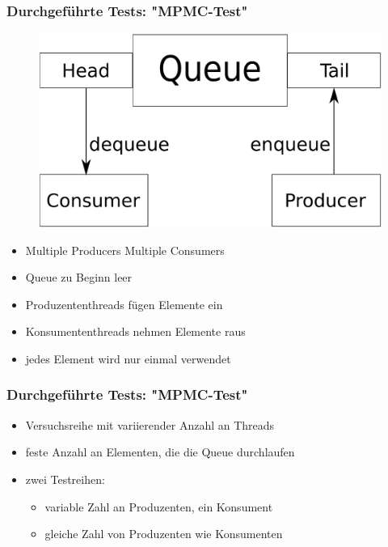 \documentclass[svgnames]{beamer}
\begin{document}
\begin{frame}
\frametitle{Durchgef\"uhrte Tests: "MPMC-Test"}
\begin {figure}
      \begin{center}
	\includegraphics[scale=0.25]{mpmc.pdf}
     \end{center}
\end {figure}

\begin{itemize}
 \item Multiple Producers Multiple Consumers
 \item Queue zu Beginn leer
 \item Produzententhreads f\"ugen Elemente ein
 \item Konsumententhreads nehmen Elemente raus
 \item jedes Element wird nur einmal verwendet


\end{itemize}
\end{frame}

\begin{frame}
\frametitle{Durchgef\"uhrte Tests: "MPMC-Test"}
\begin{itemize}
 \item Versuchsreihe mit variierender Anzahl an Threads
 \item feste Anzahl an Elementen, die die Queue durchlaufen
 \item zwei Testreihen:
\begin{itemize}
 \item variable Zahl an Produzenten, ein Konsument
 \item gleiche Zahl von Produzenten wie Konsumenten
\end{itemize}


\end{itemize}
\end{frame}
\end{document}
